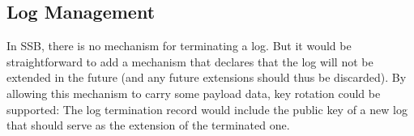\documentclass[10pt,sigconf]{acmart}
\begin{document}
\subsection{Log Management}

In SSB, there is no mechanism for terminating a log. But it would be straightforward to add a mechanism that declares that the log will not be extended in the future (and any future extensions should thus be discarded). By allowing this mechanism to carry some payload data, key rotation could be supported: The log termination record would include the public key of a new log that should serve as the extension of the terminated one.

%
%



\end{document}
